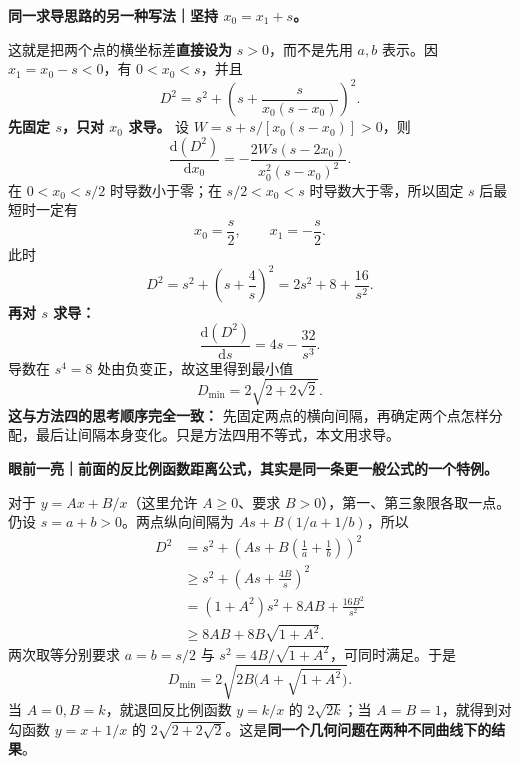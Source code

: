 \clearpage
\begin{proofbox}
\textbf{同一求导思路的另一种写法｜坚持 $x_0=x_1+s$。}

这就是把两个点的横坐标差\textbf{直接设为} $s>0$，而不是先用 $a,b$ 表示。因 $x_1=x_0-s<0$，有 $0<x_0<s$，并且
\[
D^2=s^2+\left(s+\frac{s}{x_0(s-x_0)}\right)^2.
\]
\textbf{先固定 $s$，只对 $x_0$ 求导。} 设 $W=s+s/[x_0(s-x_0)]>0$，则
\[
\frac{\mathrm d(D^2)}{\mathrm d x_0}
=-\frac{2Ws(s-2x_0)}{x_0^2(s-x_0)^2}.
\]
在 $0<x_0<s/2$ 时导数小于零；在 $s/2<x_0<s$ 时导数大于零，所以固定 $s$ 后最短时一定有
\[
\boxed{x_0=\frac{s}{2}},\qquad x_1=-\frac{s}{2}.
\]
此时
\[
D^2=s^2+\left(s+\frac4s\right)^2
=2s^2+8+\frac{16}{s^2}.
\]
\textbf{再对 $s$ 求导：}
\[
\frac{\mathrm d(D^2)}{\mathrm ds}=4s-\frac{32}{s^3}.
\]
导数在 $s^4=8$ 处由负变正，故这里得到最小值
\[
\boxed{D_{\min}=2\sqrt{2+2\sqrt2}}.
\]
\textbf{这与方法四的思考顺序完全一致：} 先固定两点的横向间隔，再确定两个点怎样分配，最后让间隔本身变化。只是方法四用不等式，本文用求导。

\medskip
\textbf{眼前一亮｜前面的反比例函数距离公式，其实是同一条更一般公式的一个特例。}

对于 $y=Ax+B/x$（这里允许 $A\ge0$、要求 $B>0$），第一、第三象限各取一点。仍设 $s=a+b>0$。两点纵向间隔为 $As+B(1/a+1/b)$，所以
\[
\begin{aligned}
D^2&=s^2+\left(As+B\left(\frac1a+\frac1b\right)\right)^2\\
&\ge s^2+\left(As+\frac{4B}{s}\right)^2\\
&=(1+A^2)s^2+8AB+\frac{16B^2}{s^2}\\
&\ge8AB+8B\sqrt{1+A^2}.
\end{aligned}
\]
两次取等分别要求 $a=b=s/2$ 与 $s^2=4B/\sqrt{1+A^2}$，可同时满足。于是
\[
\boxed{D_{\min}=2\sqrt{2B\bigl(A+\sqrt{1+A^2}\bigr)}}.
\]
当 $A=0,B=k$，就退回反比例函数 $y=k/x$ 的 $2\sqrt{2k}$；当 $A=B=1$，就得到对勾函数 $y=x+1/x$ 的 $2\sqrt{2+2\sqrt2}$。这是\textbf{同一个几何问题在两种不同曲线下的结果}。
\end{proofbox}
